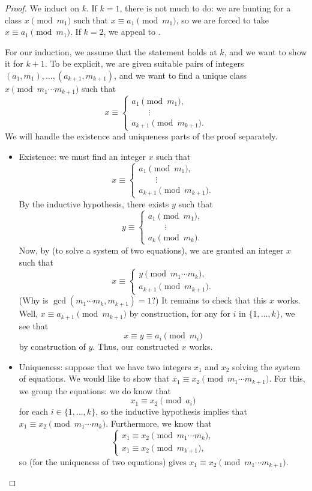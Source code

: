 \documentclass{article}
\begin{document}
\begin{proof}
	We induct on $k$. If $k=1$, there is not much to do: we are hunting for a class $x\pmod{m_1}$ such that $x\equiv a_1\pmod{m_1}$, so we are forced to take $x\equiv a_1\pmod{m_1}$. If $k=2$, we appeal to .

	For our induction, we assume that the statement holds at $k$, and we want to show it for $k+1$. To be explicit, we are given suitable pairs of integers $(a_1,m_1),\ldots,(a_{k+1},m_{k+1})$, and we want to find a unique class $x\pmod{m_1\cdots m_{k+1}}$ such that
	\[x\equiv\begin{cases}
		a_1 \pmod{m_1}, \\
		\qquad\vdots \\
		a_{k+1} \pmod{m_{k+1}}.
	\end{cases}\]
	We will handle the existence and uniqueness parts of the proof separately.
	\begin{itemize}
		\item Existence: we must find an integer $x$ such that
		\[x\equiv\begin{cases}
			a_1 \pmod{m_1}, \\
			\qquad\vdots \\
			a_{k+1} \pmod{m_{k+1}}.
		\end{cases}\]
		By the inductive hypothesis, there exists $y$ such that
		\[y\equiv\begin{cases}
			a_1 \pmod{m_1}, \\
			\qquad\vdots \\
			a_k \pmod{m_k}.
		\end{cases}\]
		Now, by  (to solve a system of two equations), we are granted an integer $x$ such that
		\[x\equiv\begin{cases}
			y \pmod{m_1\cdots m_k}, \\
			a_{k+1} \pmod{m_{k+1}}.
		\end{cases}\]
		(Why is $\gcd(m_1\cdots m_k,m_{k+1})=1$?) It remains to check that this $x$ works. Well, $x\equiv a_{k+1}\pmod{m_{k+1}}$ by construction, for any for $i$ in $\{1,\ldots,k\}$, we see that
		\[x\equiv y\equiv a_i\pmod{m_i}\]
		by construction of $y$. Thus, our constructed $x$ works.

		\item Uniqueness: suppose that we have two integers $x_1$ and $x_2$ solving the system of equations. We would like to show that $x_1\equiv x_2\pmod{m_1\cdots m_{k+1}}$. For this, we group the equations: we do know that
		\[x_1\equiv x_2\pmod{a_i}\]
		for each $i\in\{1,\ldots,k\}$, so the inductive hypothesis implies that $x_1\equiv x_2\pmod{m_1\cdots m_k}$. Furthermore, we know that
		\[\begin{cases}
			x_1 \equiv x_2\pmod{m_1\cdots m_k}, \\
			x_1 \equiv x_2\pmod{m_{k+1}},
		\end{cases}\]
		so  (for the uniqueness of two equations) gives $x_1\equiv x_2\pmod{m_1\cdots m_{k+1}}$.
		\qedhere
	\end{itemize}
\end{proof}
\end{document}
